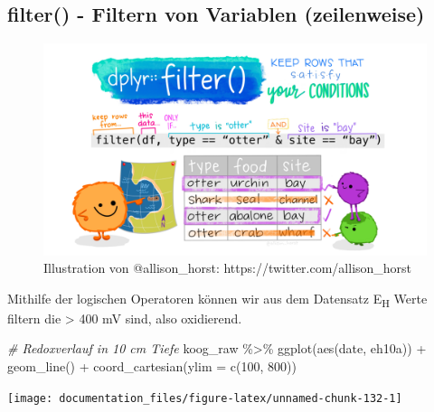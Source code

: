 \documentclass[
]{article}
\newenvironment{Shaded}{\begin{snugshade}}{\end{snugshade}}
\newcommand{\AttributeTok}[1]{\textcolor[rgb]{0.77,0.63,0.00}{#1}}
\newcommand{\CommentTok}[1]{\textcolor[rgb]{0.56,0.35,0.01}{\textit{#1}}}
\newcommand{\DecValTok}[1]{\textcolor[rgb]{0.00,0.00,0.81}{#1}}
\newcommand{\FunctionTok}[1]{\textcolor[rgb]{0.00,0.00,0.00}{#1}}
\newcommand{\NormalTok}[1]{#1}
\newcommand{\SpecialCharTok}[1]{\textcolor[rgb]{0.00,0.00,0.00}{#1}}
\begin{document}
\hypertarget{filter---filtern-von-variablen-zeilenweise}{%
\subsection{filter() - Filtern von Variablen (zeilenweise)}\label{filter---filtern-von-variablen-zeilenweise}}

\begin{figure}

{\centering \includegraphics[width=1\linewidth]{images/033} 

}

\caption{Illustration von @allison_horst: https://twitter.com/allison_horst}\label{fig:unnamed-chunk-131}
\end{figure}

Mithilfe der logischen Operatoren können wir aus dem Datensatz E\textsubscript{H} Werte filtern die \textgreater{} 400 mV sind, also oxidierend.

\begin{Shaded}
\begin{Highlighting}[]
\CommentTok{\# Redoxverlauf in 10 cm Tiefe}
\NormalTok{koog\_raw }\SpecialCharTok{\%\textgreater{}\%}
  \FunctionTok{ggplot}\NormalTok{(}\FunctionTok{aes}\NormalTok{(date, eh10a)) }\SpecialCharTok{+}
  \FunctionTok{geom\_line}\NormalTok{() }\SpecialCharTok{+}
  \FunctionTok{coord\_cartesian}\NormalTok{(}\AttributeTok{ylim =} \FunctionTok{c}\NormalTok{(}\DecValTok{100}\NormalTok{, }\DecValTok{800}\NormalTok{))}
\end{Highlighting}
\end{Shaded}

\begin{center}\texttt{[image: documentation\_files/figure-latex/unnamed-chunk-132-1]} \end{center}
\end{document}
